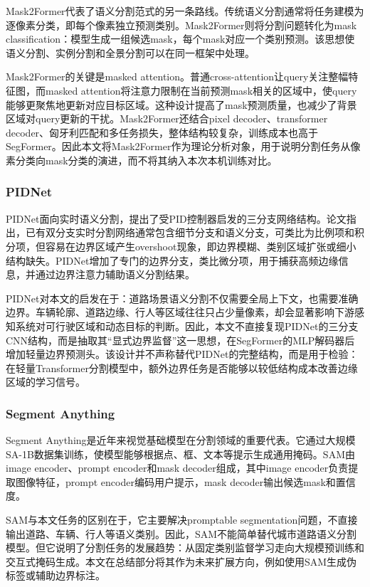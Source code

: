 \documentclass{report}
\begin{document}
Mask2Former代表了语义分割范式的另一条路线。传统语义分割通常将任务建模为逐像素分类，即每个像素独立预测类别。Mask2Former则将分割问题转化为mask classification：模型生成一组候选mask，每个mask对应一个类别预测。该思想使语义分割、实例分割和全景分割可以在同一框架中处理。

Mask2Former的关键是masked attention。普通cross-attention让query关注整幅特征图，而masked attention将注意力限制在当前预测mask相关的区域中，使query能够更聚焦地更新对应目标区域。这种设计提高了mask预测质量，也减少了背景区域对query更新的干扰。Mask2Former还结合pixel decoder、transformer decoder、匈牙利匹配和多任务损失，整体结构较复杂，训练成本也高于SegFormer。因此本文将Mask2Former作为理论分析对象，用于说明分割任务从像素分类向mask分类的演进，而不将其纳入本次本机训练对比。

\subsubsection{PIDNet}

PIDNet面向实时语义分割，提出了受PID控制器启发的三分支网络结构。论文指出，已有双分支实时分割网络通常包含细节分支和语义分支，可类比为比例项和积分项，但容易在边界区域产生overshoot现象，即边界模糊、类别区域扩张或细小结构缺失。PIDNet增加了专门的边界分支，类比微分项，用于捕获高频边缘信息，并通过边界注意力辅助语义分割结果。

PIDNet对本文的启发在于：道路场景语义分割不仅需要全局上下文，也需要准确边界。车辆轮廓、道路边缘、行人等区域往往只占少量像素，却会显著影响下游感知系统对可行驶区域和动态目标的判断。因此，本文不直接复现PIDNet的三分支CNN结构，而是抽取其“显式边界监督”这一思想，在SegFormer的MLP解码器后增加轻量边界预测头。该设计并不声称替代PIDNet的完整结构，而是用于检验：在轻量Transformer分割模型中，额外边界任务是否能够以较低结构成本改善边缘区域的学习信号。

\subsubsection{Segment Anything}

Segment Anything是近年来视觉基础模型在分割领域的重要代表。它通过大规模SA-1B数据集训练，使模型能够根据点、框、文本等提示生成通用掩码。SAM由image encoder、prompt encoder和mask decoder组成，其中image encoder负责提取图像特征，prompt encoder编码用户提示，mask decoder输出候选mask和置信度。

SAM与本文任务的区别在于，它主要解决promptable segmentation问题，不直接输出道路、车辆、行人等语义类别。因此，SAM不能简单替代城市道路语义分割模型。但它说明了分割任务的发展趋势：从固定类别监督学习走向大规模预训练和交互式掩码生成。本文在总结部分将其作为未来扩展方向，例如使用SAM生成伪标签或辅助边界标注。
\end{document}
